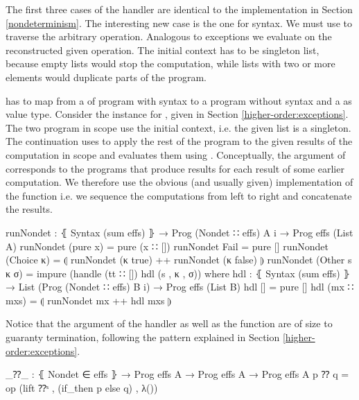 The first three cases of the handler are identical to the implementation in
Section \ref{nondeterminism}.
The interesting new case is the one for  syntax.
We must use  to traverse the arbitrary operation.
Analogous to exceptions we evaluate  on the reconstructed
given operation.
The initial context has to be singleton list, because empty lists would
stop the computation, while lists with two or more elements would duplicate
parts of the program.

 has to map from a  of program with
 syntax to a program without 
syntax and a  as value type.
Consider the  instance for , given in
Section \ref{higher-order:exceptions}.
The two program in scope use the initial context, i.e. the given list is a
singleton.
The continuation uses \AgdaFunction{<\$>} to apply the rest of the program to
the given results of the computation in scope and evaluates them using
.
Conceptually, the argument of  corresponds to the
programs that produce results for each result of some earlier computation.
We therefore use the obvious (and usually given) implementation of the
 function i.e. we sequence the computations from left to right
and concatenate the results.

\begin{code}
runNondet : ⦃ Syntax (sum effs) ⦄ → Prog (Nondet ∷ effs) A {i} → Prog effs (List A)
runNondet (pure x)       = pure (x ∷ [])
runNondet Fail           = pure []
runNondet (Choice κ)     = ⦇ runNondet (κ true) ++ runNondet (κ false) ⦈
runNondet (Other s κ σ)  = impure (handle (tt ∷ []) hdl (s , κ , σ))
  where  hdl : ⦃ Syntax (sum effs) ⦄ →
           List (Prog (Nondet ∷ effs) B {i}) → Prog effs (List B)
         hdl []          = pure []
         hdl (mx ∷ mxs)  = ⦇ runNondet mx ++ hdl mxs ⦈
\end{code}
Notice that the argument of the handler as well as the 
function are of size  to guaranty termination, following the
pattern explained in Section \ref{higher-order:exceptions}.

\begin{code}
_⁇_ : ⦃ Nondet ∈ effs ⦄ → Prog effs A → Prog effs A → Prog effs A
p ⁇ q = op (lift ⁇ˢ , (if_then p else q) , λ())
\end{code}

